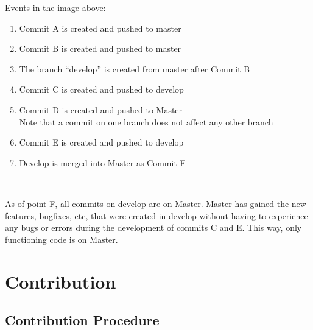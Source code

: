 \documentclass{article}
\begin{document}
Events in the image above:

\begin{enumerate}
	\item Commit A is created and pushed to master
	\item Commit B is created and pushed to master
	\item The branch ``develop'' is created from  master after Commit B
	\item Commit C is created and pushed to develop
	\item Commit D is created and pushed to Master
		\\Note that a commit on one branch does not affect any other branch
	\item Commit E is created and pushed to develop
	\item Develop is merged into Master as Commit F
\end{enumerate}

\

As of point F, all commits on develop are on Master. Master has gained the new features, bugfixes, etc, that were created in develop without having to experience any bugs or errors during the development of commits C and E. This way, only functioning code is on Master.

\pagebreak

\section{Contribution}

\subsection{Contribution Procedure}
\end{document}
